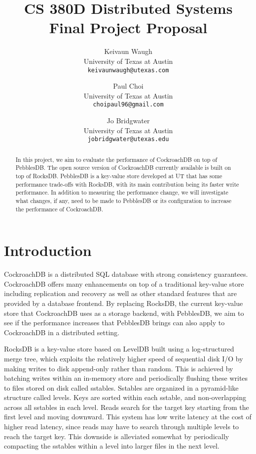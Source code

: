\documentclass[10pt,twocolumn,letterpaper]{article}
\begin{document}
\title{CS 380D Distributed Systems Final Project Proposal}

\author{Keivaun Waugh\\
University of Texas at Austin\\
{\tt\small keivaunwaugh@utexas.com}
\and
Paul Choi\\
University of Texas at Austin\\
{\tt\small choipaul96@gmail.com}
\and
Jo Bridgwater\\
University of Texas at Austin\\
{\tt\small jobridgwater@utexas.edu}
}

\maketitle

\begin{abstract}
    In this project, we aim to evaluate the performance of CockroachDB on top of
    PebblesDB. The open source version of CockroachDB currently available is
    built on top of RocksDB. PebblesDB is a key-value store developed at UT
    that has some performance trade-offs with RocksDB, with its main
    contribution being its faster write performance. In addition to measuring
    the performance change, we will investigate what changes, if any, need to
    be made to PebblesDB or its configuration to increase the performance of
    CockroachDB.
\end{abstract}

\section{Introduction}
CockroachDB is a distributed SQL database with strong consistency guarantees.
CockroachDB offers many enhancements on top of a traditional key-value store
including replication and recovery as well as other standard features that are
provided by a database frontend. By replacing RocksDB, the current key-value
store that CockroachDB uses as a storage backend, with PebblesDB, we aim to see
if the performance increases that PebblesDB brings can also apply to
CockroachDB in a distributed setting.

RocksDB is a key-value store based on LevelDB built using a log-structured
merge tree, which exploits the relatively higher speed of sequential disk I/O
by making writes to disk append-only rather than random. This is achieved by
batching writes within an in-memory store and periodically flushing these
writes to files stored on disk called sstables. Sstables are organized in a
pyramid-like structure called levels. Keys are sorted within each sstable, and
non-overlapping across all sstables in each level. Reads search for the target
key starting from the first level and moving downward. This system has low
write latency at the cost of higher read latency, since reads may have to
search through multiple levels to reach the target key. This downside is
alleviated somewhat by periodically compacting the sstables within a level into
larger files in the next level.
\end{document}
